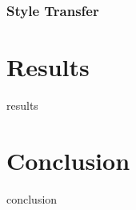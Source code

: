 \documentclass[10pt,twocolumn,letterpaper]{article}
\begin{document}
\subsubsection{Style Transfer}



\section{Results}

results

\section{Conclusion}

conclusion


{\small


}
\end{document}
